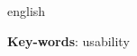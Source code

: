 \begin{resumo}[Abstract]
  \begin{otherlanguage*}{english} 
  

  \vspace{\onelineskip}
 
  \noindent 
  \textbf{Key-words}: usability
  \end{otherlanguage*}
\end{resumo}


